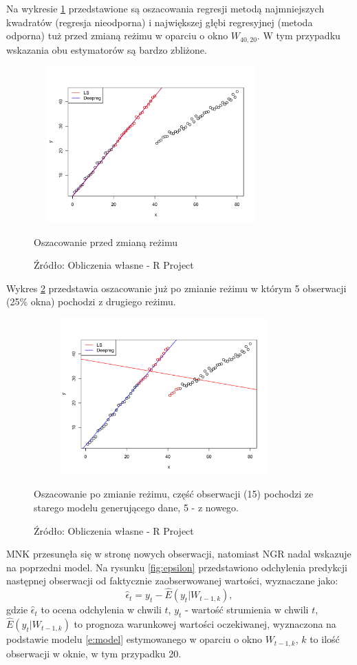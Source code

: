 \documentclass[man,mfu]{mgrwms}
\begin{document}
Na wykresie \ref{fig:start} przedstawione są oszacowania regresji metodą najmniejszych kwadratów (regresja nieodporna) i największej głębi regresyjnej (metoda odporna) tuż przed zmianą reżimu w oparciu o okno $W_{40,20}$. W tym przypadku wskazania obu estymatorów są bardzo zbliżone.

\begin{figure}[h]
\vspace{-15pt}
\centering
\includegraphics[width=90mm,height = 60mm]{start}
\caption{Oszacowanie przed zmianą reżimu}
\caption*{Źródło: Obliczenia własne - R Project}
\label{fig:start}
\end{figure}

Wykres \ref{fig:middle} przedstawia oszacowanie już po zmianie reżimu w którym 5 obserwacji (25\% okna) pochodzi z drugiego reżimu. 

\begin{figure}[H]
\centering
\vspace{-10pt}
\includegraphics[width=100mm,height = 60mm]{middle}
\caption{Oszacowanie po zmianie reżimu, część obserwacji (15) pochodzi ze starego modelu generującego dane, 5 - z nowego.}
\caption*{Źródło: Obliczenia własne - R Project}
\label{fig:middle}\vspace{-10pt}
\end{figure}

MNK przesunęła się w stronę nowych obserwacji, natomiast NGR nadal wskazuje na poprzedni model. Na rysunku \ref{fig:epsilon} przedstawiono odchylenia predykcji następnej obserwacji od faktycznie zaobserwowanej wartości, wyznaczane jako:
\begin{equation}\label{e:eps}
\hat{\epsilon}_{t} = y_{t} - \hat{E}(y_{t}|W_{t-1,k}),
\end{equation}
gdzie $\hat{\epsilon}_{t}$ to ocena odchylenia w chwili $t$, $y_{t}$ -  wartość strumienia w chwili $t$, $\hat{E}(y_{t}|W_{t-1,k})$ to prognoza warunkowej wartości oczekiwanej, wyznaczona na podstawie modelu \ref{e:model} estymowanego w oparciu o okno $W_{t-1,k}$, $k$ to ilość obserwacji w oknie, w tym przypadku 20.
\end{document}
